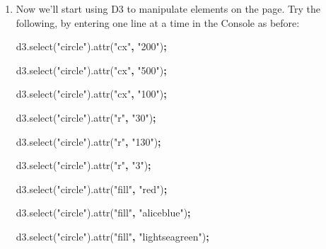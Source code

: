 \documentclass[openany]{book}
\newenvironment{Shaded}{\begin{snugshade}}{\end{snugshade}}
\newcommand{\AttributeTok}[1]{\textcolor[rgb]{0.77,0.63,0.00}{#1}}
\newcommand{\NormalTok}[1]{#1}
\newcommand{\OperatorTok}[1]{\textcolor[rgb]{0.81,0.36,0.00}{\textbf{#1}}}
\newcommand{\StringTok}[1]{\textcolor[rgb]{0.31,0.60,0.02}{#1}}
\newcommand{\VariableTok}[1]{\textcolor[rgb]{0.00,0.00,0.00}{#1}}
\begin{document}
\begin{enumerate}
\def\labelenumi{\arabic{enumi}.}
\item
  Now we'll start using D3 to manipulate elements on the page. Try the following, by entering one line at a time in the Console as before:

\begin{Shaded}
\begin{Highlighting}[]
\VariableTok{d3}\NormalTok{.}\AttributeTok{select}\NormalTok{(}\StringTok{"circle"}\NormalTok{).}\AttributeTok{attr}\NormalTok{(}\StringTok{"cx"}\OperatorTok{,} \StringTok{"200"}\NormalTok{)}\OperatorTok{;}

\VariableTok{d3}\NormalTok{.}\AttributeTok{select}\NormalTok{(}\StringTok{"circle"}\NormalTok{).}\AttributeTok{attr}\NormalTok{(}\StringTok{"cx"}\OperatorTok{,} \StringTok{"500"}\NormalTok{)}\OperatorTok{;}

\VariableTok{d3}\NormalTok{.}\AttributeTok{select}\NormalTok{(}\StringTok{"circle"}\NormalTok{).}\AttributeTok{attr}\NormalTok{(}\StringTok{"cx"}\OperatorTok{,} \StringTok{"100"}\NormalTok{)}\OperatorTok{;}

\VariableTok{d3}\NormalTok{.}\AttributeTok{select}\NormalTok{(}\StringTok{"circle"}\NormalTok{).}\AttributeTok{attr}\NormalTok{(}\StringTok{"r"}\OperatorTok{,} \StringTok{"30"}\NormalTok{)}\OperatorTok{;}

\VariableTok{d3}\NormalTok{.}\AttributeTok{select}\NormalTok{(}\StringTok{"circle"}\NormalTok{).}\AttributeTok{attr}\NormalTok{(}\StringTok{"r"}\OperatorTok{,} \StringTok{"130"}\NormalTok{)}\OperatorTok{;}

\VariableTok{d3}\NormalTok{.}\AttributeTok{select}\NormalTok{(}\StringTok{"circle"}\NormalTok{).}\AttributeTok{attr}\NormalTok{(}\StringTok{"r"}\OperatorTok{,} \StringTok{"3"}\NormalTok{)}\OperatorTok{;}

\VariableTok{d3}\NormalTok{.}\AttributeTok{select}\NormalTok{(}\StringTok{"circle"}\NormalTok{).}\AttributeTok{attr}\NormalTok{(}\StringTok{"fill"}\OperatorTok{,} \StringTok{"red"}\NormalTok{)}\OperatorTok{;}

\VariableTok{d3}\NormalTok{.}\AttributeTok{select}\NormalTok{(}\StringTok{"circle"}\NormalTok{).}\AttributeTok{attr}\NormalTok{(}\StringTok{"fill"}\OperatorTok{,} \StringTok{"aliceblue"}\NormalTok{)}\OperatorTok{;}

\VariableTok{d3}\NormalTok{.}\AttributeTok{select}\NormalTok{(}\StringTok{"circle"}\NormalTok{).}\AttributeTok{attr}\NormalTok{(}\StringTok{"fill"}\OperatorTok{,} \StringTok{"lightseagreen"}\NormalTok{)}\OperatorTok{;}
\end{Highlighting}
\end{Shaded}
\end{enumerate}
\end{document}
